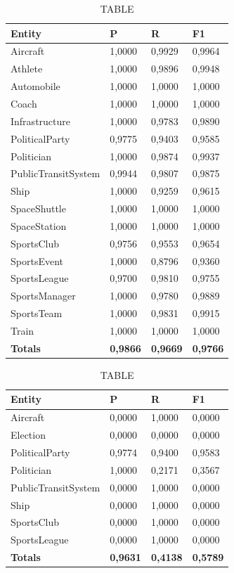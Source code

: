 \documentclass[thesis=M,english]{FITthesis}[2018/05/30]
\begin{document}
\begin{table}[H]\centering
		\caption{TABLE}
		\label{}
		\begin{tabular}{|l|l|l|l|}
			\hline {\textbf{Entity}} & {\textbf{P}} & {\textbf{R}} & {\textbf{F1}}\\\hline
				Aircraft & 1,0000 & 0,9929 & 0,9964\\
				Athlete & 1,0000 & 0,9896 & 0,9948\\
				Automobile & 1,0000 & 1,0000 & 1,0000\\ 
				Coach & 1,0000 & 1,0000 & 1,0000\\
				Infrastructure & 1,0000 & 0,9783 & 0,9890\\
				PoliticalParty & 0,9775 & 0,9403 & 0,9585\\
				Politician & 1,0000 & 0,9874 & 0,9937\\
				PublicTransitSystem & 0,9944 & 0,9807 & 0,9875\\
				Ship & 1,0000 & 0,9259 & 0,9615\\
				SpaceShuttle & 1,0000 & 1,0000 & 1,0000\\
				SpaceStation & 1,0000 & 1,0000 & 1,0000\\ 
				SportsClub & 0,9756 & 0,9553 & 0,9654\\
				SportsEvent & 1,0000 & 0,8796 & 0,9360\\
				SportsLeague & 0,9700 & 0,9810 & 0,9755\\
				SportsManager & 1,0000 & 0,9780 & 0,9889\\
				SportsTeam & 1,0000 & 0,9831 & 0,9915\\
				Train & 1,0000 & 1,0000 & 1,0000\\\hline
				\textbf{Totals} & \textbf{0,9866} & \textbf{0,9669} & \textbf{0,9766}\\\hline
		\end{tabular}
	\end{table}

	\begin{table}[H]\centering
		\caption{TABLE}
		\label{}
		\begin{tabular}{|l|l|l|l|}
			\hline {\textbf{Entity}} & {\textbf{P}} & {\textbf{R}} & {\textbf{F1}}\\\hline
				Aircraft & 0,0000 & 1,0000 & 0,0000\\				
				Election & 0,0000 & 0,0000 & 0,0000\\
				PoliticalParty & 0,9774 & 0,9400 & 0,9583\\
				Politician & 1,0000 & 0,2171 & 0,3567\\
				PublicTransitSystem & 0,0000 & 1,0000 & 0,0000\\
				Ship & 0,0000 & 1,0000 & 0,0000\\
				SportsClub & 0,0000 & 1,0000 & 0,0000\\
				SportsLeague & 0,0000 & 1,0000 & 0,0000\\\hline
				\textbf{Totals} & \textbf{0,9631} & \textbf{0,4138} & \textbf{0,5789}\\\hline
		\end{tabular}
	\end{table}	
\end{document}
